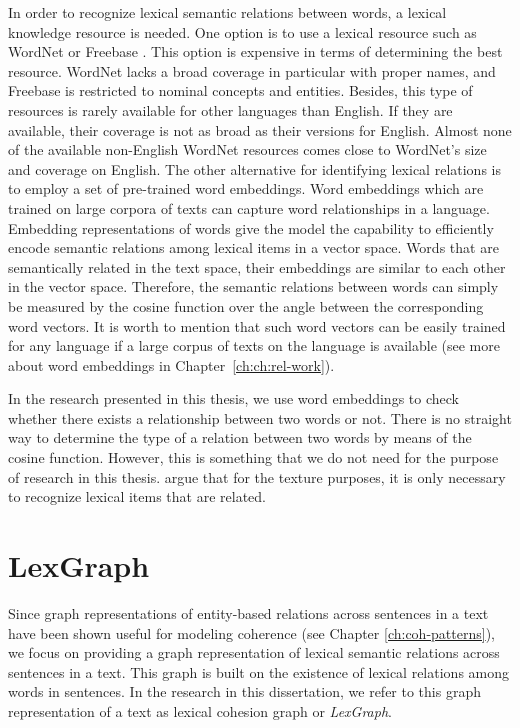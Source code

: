 In order to recognize lexical semantic relations between words, a lexical knowledge resource is needed.   
One option is to use a lexical resource such as WordNet \cite{fellbaum98} or Freebase \cite{bollacker08}.  
This option is expensive in terms of determining the best resource.  
WordNet lacks a broad coverage in particular with proper names, and Freebase is restricted to nominal concepts and entities. 
Besides, this type of resources is rarely available for other languages than English.
If they are available, their coverage is not as broad as their versions for English. 
Almost none of the available non-English WordNet resources comes close to WordNet's size and coverage on English. 
The other alternative for identifying lexical relations is to employ a set of pre-trained word embeddings. 
Word embeddings which are trained on large corpora of texts can capture word relationships in a language. 
Embedding representations of words give the model the capability to efficiently encode semantic relations among lexical items in a vector space. 
Words that are semantically related in the text space, their embeddings are similar to each other in the vector space. 
Therefore, the semantic relations between words can simply be measured by the cosine function over the angle between the corresponding word vectors. 
It is worth to mention that such word vectors can be easily trained for any language if a large corpus of texts on the language is available (see more about word embeddings in Chapter~\ref{ch:ch:rel-work}).  

In the research presented in this thesis, we use word embeddings to check whether there exists a relationship between two words or not.  
There is no straight way to determine the type of a relation between two words by means of the cosine function. 
However, this is something that we do not need for the purpose of research in this thesis. 
 argue that for the texture purposes, it is only necessary to recognize lexical items that are related. 

\section{LexGraph}
\label{sec:lex-graph-representation}

Since graph representations of entity-based relations across sentences in a text have been shown useful for modeling coherence (see Chapter \ref{ch:coh-patterns}), we focus on providing a graph representation of lexical semantic relations across sentences in a text. 
This graph is built on the existence of lexical relations among words in sentences. 
In the research in this dissertation, we refer to this graph representation of a text as lexical cohesion graph or \emph{LexGraph}. 

